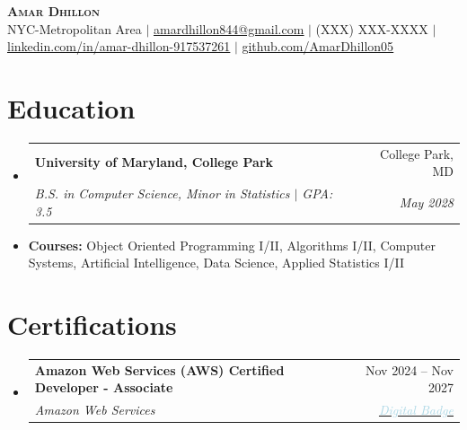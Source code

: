 \documentclass[letterpaper,9.5pt]{extarticle}
\makeatletter
\newcommand{\resumeItem}[1]{\item\footnotesize{#1\vspace{-2pt}}}
\newcommand{\resumeSubheading}[4]{%
  \vspace{-2pt}\item
  \begin{tabular*}{0.97\textwidth}[t]{l@{\extracolsep{\fill}}r}
    \textbf{\small#1} & \small#2 \\
    \textit{\small#3} & \textit{\small #4} \\
  \end{tabular*}\vspace{-7pt}%
}
\newcommand{\resumeItem}[1]{
  \item\small{
    {#1 \vspace{-2pt}}
  }
}
\newcommand{\resumeSubheading}[4]{
  \vspace{-2pt}\item
    \begin{tabular*}{0.97\textwidth}[t]{l@{\extracolsep{\fill}}r}
      \textbf{#1} & #2 \\
      \textit{\small#3} & \textit{\small #4} \\
    \end{tabular*}\vspace{-7pt}
}
\newcommand{\resumeSubHeadingListStart}{\begin{itemize}[leftmargin=0.15in, label={}]}
\newcommand{\resumeSubHeadingListEnd}{\end{itemize}}
\newcommand{\resumeItemListStart}{\begin{itemize}}
\newcommand{\resumeItemListEnd}{\end{itemize}\vspace{-5pt}}
\makeatother
\begin{document}
\fontsize{8.5pt}{10pt}\selectfont




\begin{center}
    \textcolor{myblue}{\textbf{\fontsize{22}{26}\selectfont \scshape Amar Dhillon}} \\ \vspace{1pt}
    \footnotesize
    NYC-Metropolitan Area $|$
    \href{mailto:amardhillon844@gmail.com}{\underline{amardhillon844@gmail.com}} $|$
    (XXX) XXX-XXXX $|$
    \href{https://linkedin.com/in/amar-dhillon-917537261}{\underline{linkedin.com/in/amar-dhillon-917537261}} $|$
    \href{https://github.com/AmarDhillon05}{\underline{github.com/AmarDhillon05}}
\end{center}


\section{Education}
\vspace{3pt}
  \resumeSubHeadingListStart
    \resumeSubheading
      {University of Maryland, College Park}{College Park, MD}
      {B.S. in Computer Science, Minor in Statistics $|$ GPA: 3.5}{May 2028}
        \resumeItem{\textbf{Courses:} Object Oriented Programming I/II, Algorithms I/II, Computer Systems, Artificial Intelligence, Data Science, Applied Statistics I/II}
  \resumeSubHeadingListEnd


\section{Certifications}
\vspace{3pt}
\resumeSubHeadingListStart
  \resumeSubheading
    {Amazon Web Services (AWS) Certified Developer - Associate}{Nov 2024 -- Nov 2027}
    {Amazon Web Services}{{\href{https://www.credly.com/badges/d2406a97-d937-47de-823b-724981159d3b/public_url}
{\textcolor{lightblue}{Digital Badge}}}}
\resumeSubHeadingListEnd
\end{document}
